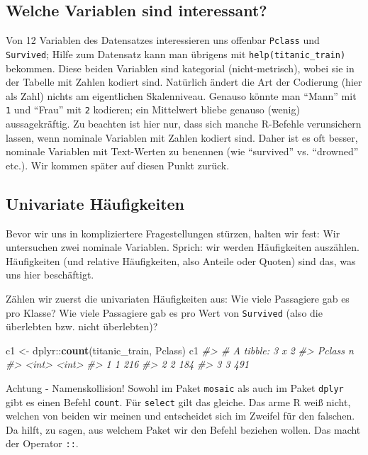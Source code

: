 \documentclass[12pt,ngerman,]{book}
\makeatletter
\newenvironment{Shaded}{\begin{snugshade}}{\end{snugshade}}
\newcommand{\KeywordTok}[1]{\textcolor[rgb]{0.13,0.29,0.53}{\textbf{{#1}}}}
\newcommand{\StringTok}[1]{\textcolor[rgb]{0.31,0.60,0.02}{{#1}}}
\newcommand{\CommentTok}[1]{\textcolor[rgb]{0.56,0.35,0.01}{\textit{{#1}}}}
\newcommand{\NormalTok}[1]{{#1}}
\newenvironment{kframe}{%
\medskip{}
\setlength{\fboxsep}{.8em}
 \def\at@end@of@kframe{}%
 \ifinner\ifhmode%
  \def\at@end@of@kframe{\end{minipage}}%
  \begin{minipage}{\columnwidth}%
 \fi\fi%
 \def\FrameCommand##1{\hskip\@totalleftmargin \hskip-\fboxsep
 \colorbox{shadecolor}{##1}\hskip-\fboxsep
     \hskip-\linewidth \hskip-\@totalleftmargin \hskip\columnwidth}%
 \MakeFramed {\advance\hsize-\width
   \@totalleftmargin\z@ \linewidth\hsize
   \@setminipage}}%
 {\par\unskip\endMakeFramed%
 \at@end@of@kframe}
\renewenvironment{Shaded}{\begin{kframe}}{\end{kframe}}
\let\BeginKnitrBlock\begin \let\EndKnitrBlock\end
\makeatother
\begin{document}
\subsection{Welche Variablen sind
interessant?}\label{welche-variablen-sind-interessant}

Von 12 Variablen des Datensatzes interessieren uns offenbar
\texttt{Pclass} und \texttt{Survived}; Hilfe zum Datensatz kann man
übrigens mit \texttt{help(titanic\_train)} bekommen. Diese beiden
Variablen sind kategorial (nicht-metrisch), wobei sie in der Tabelle mit
Zahlen kodiert sind. Natürlich ändert die Art der Codierung (hier als
Zahl) nichts am eigentlichen Skalenniveau. Genauso könnte man ``Mann''
mit \texttt{1} und ``Frau'' mit \texttt{2} kodieren; ein Mittelwert
bliebe genauso (wenig) aussagekräftig. Zu beachten ist hier nur, dass
sich manche R-Befehle verunsichern lassen, wenn nominale Variablen mit
Zahlen kodiert sind. Daher ist es oft besser, nominale Variablen mit
Text-Werten zu benennen (wie ``survived'' vs. ``drowned'' etc.). Wir
kommen später auf diesen Punkt zurück.

\subsection{Univariate Häufigkeiten}\label{univariate-haufigkeiten}

Bevor wir uns in kompliziertere Fragestellungen stürzen, halten wir
fest: Wir untersuchen zwei nominale Variablen. Sprich: wir werden
Häufigkeiten auszählen. Häufigkeiten (und relative Häufigkeiten, also
Anteile oder Quoten) sind das, was uns hier beschäftigt.

Zählen wir zuerst die univariaten Häufigkeiten aus: Wie viele Passagiere
gab es pro Klasse? Wie viele Passagiere gab es pro Wert von
\texttt{Survived} (also die überlebten bzw. nicht überlebten)?

\begin{Shaded}
\begin{Highlighting}[]
\NormalTok{c1 <-}\StringTok{ }\NormalTok{dplyr::}\KeywordTok{count}\NormalTok{(titanic_train, Pclass)}
\NormalTok{c1}
\CommentTok{#> # A tibble: 3 x 2}
\CommentTok{#>   Pclass     n}
\CommentTok{#>    <int> <int>}
\CommentTok{#> 1      1   216}
\CommentTok{#> 2      2   184}
\CommentTok{#> 3      3   491}
\end{Highlighting}
\end{Shaded}

\BeginKnitrBlock{rmdcaution}
Achtung - Namenskollision! Sowohl im Paket \texttt{mosaic} als auch im
Paket \texttt{dplyr} gibt es einen Befehl \texttt{count}. Für
\texttt{select} gilt das gleiche. Das arme R weiß nicht, welchen von
beiden wir meinen und entscheidet sich im Zweifel für den falschen. Da
hilft, zu sagen, aus welchem Paket wir den Befehl beziehen wollen. Das
macht der Operator \texttt{::}.
\EndKnitrBlock{rmdcaution}
\end{document}
